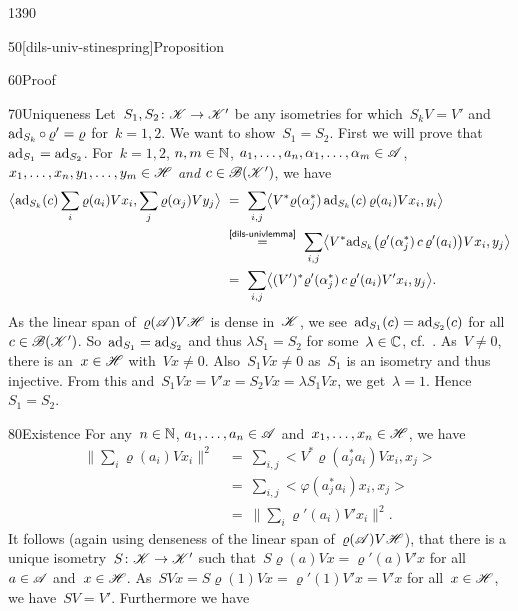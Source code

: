 \begin{parsec}{1390}
\begin{point}{50}[dils-univ-stinespring]{Proposition}
\begin{point}{60}{Proof}
\begin{point}{70}{Uniqueness}
Let~$S_1,S_2\colon \mathscr{K} \to \mathscr{K}'$
be any isometries for which~$S_k V = V'$ and~$\mathrm{ad}_{S_k} \mathop{\circ} \varrho' = \varrho$
for~$k =1,2$.
We want to show~$S_1=S_2$.
First we will prove that~$\mathrm{ad}_{S_1} = \mathrm{ad}_{S_2}$.
For~$k=1,2$, $n, m\in \mathbb{N}$, $a_1, \ldots, a_n,\alpha_1, \ldots, \alpha_m \in \mathscr{A}$,
$x_1, \ldots, x_n, y_1, \ldots, y_m \in \mathscr{H}$ \emph{and}
    $c \in \mathscr{B}(\mathscr{K}')$,
    we have
\begin{align*}
    \bigl< \ad_{S_k}(c)
        \sum_i \varrho(a_i) V x_i,
        \sum_j \varrho(\alpha_j) V y_j \bigr>
    &\ = \ \sum_{i,j}
        \bigl< V^* \varrho(\alpha_j^*) \,\ad_{S_k}(c)\, \varrho(a_i) V x_i, y_i
            \bigr> \\
            & \ \stackrel{\sref{dils-univlemma}}{=} \ \sum_{i,j}
        \bigl< V^* \ad_{S_k} \bigl(\varrho'(\alpha_j^*) \,c\,
            \varrho'(a_i)\bigr) V x_i, y_j\bigr> \\
    & \ =\  \sum_{i,j}
        \bigl< (V')^* \varrho'(\alpha_j^*) \,c\, \varrho'(a_i) V' x_i, y_j
            \bigr>.
\end{align*}
As the linear span of~$\varrho(\mathscr{A}) V\mathscr{H}$ is dense in~$\mathscr{K}$,
we see~$\mathrm{ad}_{S_1}(c) = \mathrm{ad}_{S_2}(c)$ for all~$c \in \mathscr{B}(\mathscr{K}')$.
So~$\mathrm{ad}_{S_1} = \mathrm{ad}_{S_2}$
    and thus $\lambda S_1= S_2$ for some~$\lambda \in \mathbb{C}$,
cf.~\cite[lem.~9]{westerbaan2016universal}.
As~$V \neq 0$, there is an~$x \in \mathscr{H}$ with~$Vx \neq 0$.
Also~$S_1 V x \neq 0$ as~$S_1$ is an isometry and thus injective.
From this and~$S_1 V x = V'x = S_2Vx = \lambda S_1 Vx$, we get~$\lambda=1$.
Hence~$S_1=S_2$.
\end{point}
\begin{point}{80}{Existence}%
For any~$n \in \mathbb{N}$, $a_1, \ldots, a_n \in \mathscr{A}$
    and~$x_1, \ldots, x_n \in \mathscr{H}$, we have
\begin{align*}
\bigl\| \sum_i \varrho(a_i)Vx_i \bigr\|^2
&\ =\  \sum_{i,j} \bigl< V^* \varrho(a_j^*a_i) Vx_i, x_j\bigr> \\
&\ =\  \sum_{i,j} \bigl< \varphi(a_j^* a_i)x_i, x_j \bigr> \\
&\ =\  \bigl\| \sum_i \varrho'(a_i) V'x_i \bigr\|^2.
\end{align*}
It follows (again
    using denseness of the linear span of~$\varrho(\mathscr{A}) V \mathscr{H}$),
that there is a unique isometry~$S\colon \mathscr{K} \to \mathscr{K}'$
    such that~$S\varrho(a) Vx = \varrho'(a)V' x$
        for all~$a\in \mathscr{A}$ and~$x \in\mathscr{H}$.
As~$SVx = S\varrho(1)Vx=\varrho'(1)V'x = V'x$ for all~$x\in \mathscr{H}$,
    we have~$SV = V'$. Furthermore
we have
\begin{align*}

\end{align*}
\end{point}
\end{point}
\end{point}
\end{parsec}
